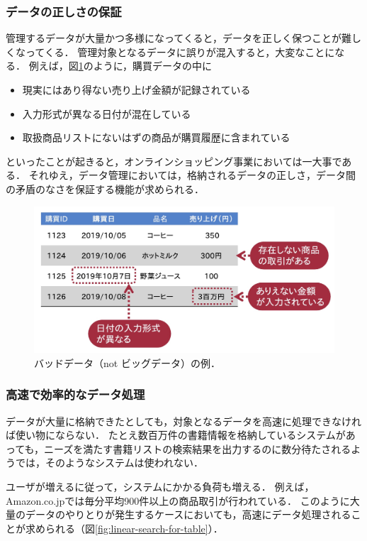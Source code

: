 \subsubsection{データの正しさの保証}
管理するデータが大量かつ多様になってくると，データを正しく保つことが難しくなってくる．
管理対象となるデータに誤りが混入すると，大変なことになる．
例えば，図\ref{fig:bad-data}のように，購買データの中に
\begin{itemize}
\item 現実にはあり得ない売り上げ金額が記録されている
\item 入力形式が異なる日付が混在している
\item 取扱商品リストにないはずの商品が購買履歴に含まれている
\end{itemize}
といったことが起きると，オンラインショッピング事業においては一大事である．
それゆえ，データ管理においては，格納されるデータの正しさ，データ間の矛盾のなさを保証する機能が求められる．

\begin{figure}[tb]
    \centering
    \includegraphics[width=1.0\textwidth]{figure/bad-data.jpg}
    \caption{バッドデータ（not ビッグデータ）の例．}
    \label{fig:bad-data}
\end{figure}


\subsubsection{高速で効率的なデータ処理}
データが大量に格納できたとしても，対象となるデータを高速に処理できなければ使い物にならない．
たとえ数百万件の書籍情報を格納しているシステムがあっても，ニーズを満たす書籍リストの検索結果を出力するのに数分待たされるようでは，そのようなシステムは使われない．

ユーザが増えるに従って，システムにかかる負荷も増える．
例えば，Amazon.co.jpでは毎分平均900件以上の商品取引が行われている\cite{TransactionInAmazon}．
このように大量のデータのやりとりが発生するケースにおいても，高速にデータ処理されることが求められる（図\ref{fig:linear-search-for-table}）．

